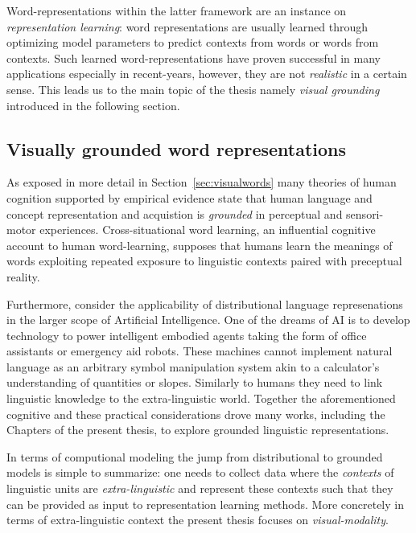 Word-representations within the latter framework are an instance on \emph{representation learning}:
word representations are usually learned through
optimizing model parameters to predict contexts from words or words from contexts.
Such learned word-representations have proven successful in many applications especially 
in recent-years, however, they are not \emph{realistic} in a certain sense. 
This leads us to the main topic of the thesis namely \emph{visual grounding} introduced in the
following section.

\subsection{Visually grounded word representations}


As exposed in more detail in Section~\ref{sec:visualwords} many theories of human cognition supported by empirical
evidence state that human language and concept representation and acquistion is \emph{grounded}
in perceptual and sensori-motor experiences. Cross-situational word learning, 
an influential cognitive account to human word-learning, supposes that humans learn the
meanings of words exploiting repeated exposure to linguistic contexts paired with preceptual reality.

Furthermore, consider the applicability of distributional language represenations in the larger scope of Artificial 
Intelligence. One of the dreams of AI is to develop technology to power intelligent embodied agents
taking the form of office assistants or emergency aid robots. These machines cannot implement natural
language as an arbitrary symbol manipulation system akin to a calculator's understanding of quantities or slopes. 
Similarly to humans they need
to link linguistic knowledge to the extra-linguistic world. Together the aforementioned cognitive 
and these practical considerations drove many works, including the Chapters of the present thesis, 
to explore grounded linguistic representations.

In terms of computional modeling the jump from 
distributional to grounded models is simple to summarize: one needs to collect data where
the \emph{contexts} of linguistic units are \emph{extra-linguistic} and represent these contexts such
that they can be provided as input to representation learning methods.
More concretely in terms of extra-linguistic context the present thesis focuses on \emph{visual-modality}.

